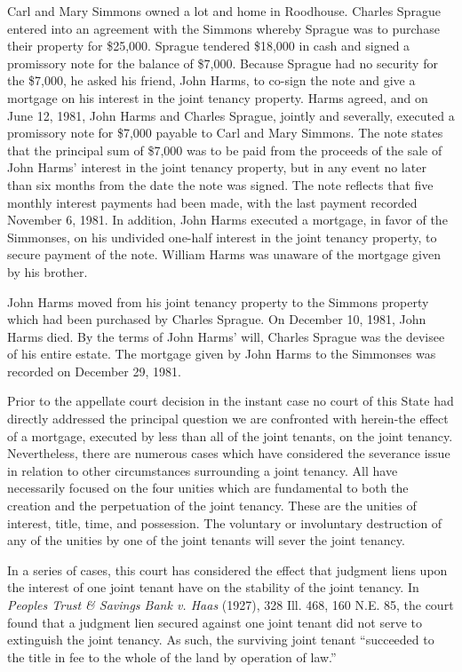 Carl and Mary Simmons owned a lot and home in Roodhouse. Charles Sprague entered
into an agreement with the Simmons whereby Sprague was to purchase their
property for \$25,000. Sprague tendered \$18,000 in cash and signed a
promissory note for the balance of \$7,000. Because Sprague had no security for
the \$7,000, he asked his friend, John Harms, to co-sign the note and give a
mortgage on his interest in the joint tenancy property. Harms agreed, and on
June 12, 1981, John Harms and Charles Sprague, jointly and severally, executed
a promissory note for \$7,000 payable to Carl and Mary Simmons. The note states
that the principal sum of \$7,000 was to be paid from the proceeds of the sale
of John Harms' interest in the joint tenancy property, but in any event no
later than six months from the date the note was signed. The note reflects that
five monthly interest payments had been made, with the last payment recorded
November 6, 1981. In addition, John Harms executed a mortgage, in favor of the
Simmonses, on his undivided one-half interest in the joint tenancy property, to
secure payment of the note. William Harms was unaware of the mortgage given by
his brother.

John Harms moved from his joint tenancy property to the Simmons property which
had been purchased by Charles Sprague. On December 10, 1981, John Harms died.
By the terms of John Harms' will, Charles Sprague was the devisee of his entire
estate. The mortgage given by John Harms to the Simmonses was recorded on
December 29, 1981.

Prior to the appellate court decision in the instant case no court of this State
had directly addressed the principal question we are confronted with herein-the
effect of a mortgage, executed by less than all of the joint tenants, on the
joint tenancy. Nevertheless, there are numerous cases which have considered the
severance issue in relation to other circumstances surrounding a joint tenancy.
All have necessarily focused on the four unities which are fundamental to both
the creation and the perpetuation of the joint tenancy. These are the unities
of interest, title, time, and possession. The voluntary or involuntary
destruction of any of the unities by one of the joint tenants will sever the
joint tenancy.

In a series of cases, this court has considered the effect that judgment liens
upon the interest of one joint tenant have on the stability of the joint
tenancy. In \emph{Peoples Trust \& Savings Bank v. Haas} (1927), 328 Ill. 468,
160 N.E. 85, the court found that a judgment lien secured against one joint
tenant did not serve to extinguish the joint tenancy. As such, the surviving
joint tenant ``succeeded to the title in fee to the whole of the land by
operation of law.''

